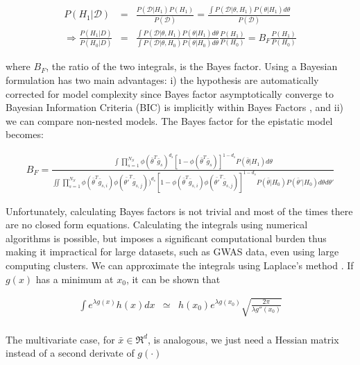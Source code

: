 \begin{eqnarray*}
	P(H_1 | \mathcal{D}) & = & \frac{ P( \mathcal{D} | H_1) P(H_1) }{ P(\mathcal{D}) } = \frac{ \int{ P(\mathcal{D} | \theta , H_1) P( \theta | H_1)  d\theta } }{ P(\mathcal{D}) }  \\
	\Rightarrow  \frac{ P(H_1 | D)  }{ P(H_0 | D)  } & = & \frac{ \int{ P(\mathcal{D} | \theta , H_1) P( \theta | H_1)  d\theta } }{\int{ P(\mathcal{D} | \theta , H_0 ) P( \theta | H_0)  d\theta } } \frac{ P(H_1) }{ P(H_0)  }  
	=  B_F \frac{ P(H_1) }{ P(H_0)  }
\end{eqnarray*}

where $B_F$, the ratio of the two integrals, is the Bayes factor. Using a Bayesian formulation has two main advantages: i) the hypothesis are automatically corrected for model complexity since Bayes factor asymptotically converge to Bayesian Information Criteria (BIC) is implicitly within Bayes Factors \cite{kass1995bayes}, and ii) we can compare non-nested models. The Bayes factor for the epistatic model becomes:

\begin{eqnarray}\label{eq:bf2}
	B_F = \frac
	{ \int{ \prod_{s=1}^{N_S}{ \phi( \bar{\theta}^T \bar{g}_s)^{d_s} [ 1-\phi( \bar{\theta}^T \bar{g}_s) ]^{1-d_s} } P( \bar{\theta} | H_1)  d\theta } }
	{ \iint{ \prod_{s=1}^{N_S}{ 
	\phi( \bar{\theta}^T \bar{g}_{s,i}) 
	\phi( \bar{\theta'}^T \bar{g}_{s,j} ) )^{d_s} 
	[ 1-\phi( \bar{\theta}^T \bar{g}_{s,i}) \phi( \bar{\theta'}^T \bar{g}_{s,j} ) ]^{1-d_s} } 
	P( \bar{\theta} | H_0) 
	P( \bar{\theta}' | H_0)  
	d\theta d\theta' } }
\end{eqnarray}

Unfortunately, calculating Bayes factors is not trivial and most of the times there are no closed form equations. Calculating the integrals using numerical algorithms is possible, but  imposes a significant computational burden thus making it impractical for large datasets, such as GWAS data, even using large computing clusters. We can approximate the integrals using Laplace's method  \cite{kass1995bayes}. If $g(x)$ has a minimum at $x_0$, it can be shown that

\begin{eqnarray*}
	\int{e^{\lambda g(x)} h(x) dx} & \simeq & h(x_0) e^{\lambda g(x_0)} \sqrt{\frac{2 \pi}{\lambda g''(x_0)}} \\
\end{eqnarray*}

The multivariate case, for $\bar{x} \in \Re^d$, is analogous, we just need a Hessian matrix instead of a second derivate of $g(\cdot)$


